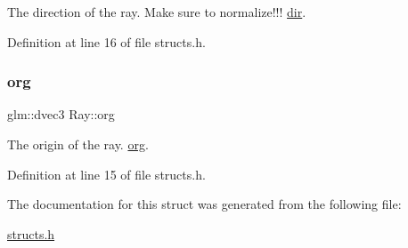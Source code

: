 The direction of the ray. Make sure to normalize!!! \mbox{\hyperlink{struct_ray_a80a47e5925e6f8d150e6ade067590520}{dir}}. 



Definition at line 16 of file structs.\+h.

\mbox{\label{struct_ray_a78a1cbfb1bd302b4c1790fbe41845d31}} 
\subsubsection{\texorpdfstring{org}{org}}
{\footnotesize\ttfamily glm\+::dvec3 Ray\+::org}



The origin of the ray. \mbox{\hyperlink{struct_ray_a78a1cbfb1bd302b4c1790fbe41845d31}{org}}. 



Definition at line 15 of file structs.\+h.



The documentation for this struct was generated from the following file\+:\begin{DoxyCompactItemize}
\item 
\mbox{\hyperlink{structs_8h}{structs.\+h}}\end{DoxyCompactItemize}

